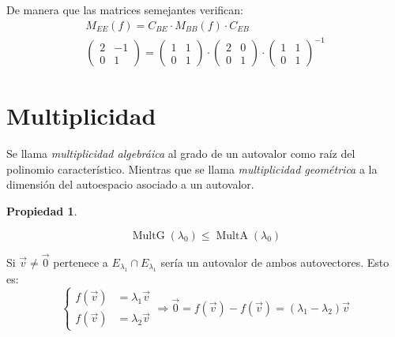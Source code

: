\documentclass[a5paper,12pt,twoside]{book}
\newtheorem{prop}{{Propiedad}}[chapter]
\begin{document}
\begin{mdframed}[style=MyFrame2]
    De manera que las matrices semejantes verifican:
    \begin{gather*}
        M_{EE}(f) = C_{BE} \cdot M_{BB}(f) \cdot C_{EB}
        \\
        \begin{pmatrix}
            2 & -1
            \\
            0 & 1
        \end{pmatrix}
        =
        \begin{pmatrix}
            1 & 1
            \\
            0 & 1
        \end{pmatrix}
        \cdot
        \begin{pmatrix}
            2 & 0
            \\
            0 & 1
        \end{pmatrix}
        \cdot
        \begin{pmatrix}
            1 & 1
            \\
            0 & 1
        \end{pmatrix}^{-1}
    \end{gather*}
\end{mdframed}


\section{Multiplicidad}

Se llama \emph{multiplicidad algebráica} al grado de un autovalor como raíz del polinomio característico. Mientras que se llama \emph{multiplicidad geométrica} a la dimensión del autoespacio asociado a un autovalor.

\begin{mdframed}[style=MyFrame1]
    \begin{prop}
    \end{prop}
    \begin{equation*}
        \operatorname{MultG} (\lambda_0) \leq \operatorname{MultA} (\lambda_0)
    \end{equation*}
\end{mdframed}

Si $\Vec{v} \neq \Vec{0}$ pertenece a $E_{\lambda_1} \cap E_{\lambda_1}$ sería un autovalor de ambos autovectores. Esto es:
\begin{equation*}
    \left\{
    \begin{aligned}
        f(\Vec{v}) &= \lambda_1 \Vec{v}
        \\
        f(\Vec{v}) &= \lambda_2 \Vec{v}
    \end{aligned}
    \right.
    \Rightarrow \Vec{0} = f(\Vec{v}) - f(\Vec{v}) = \left( \lambda_1-\lambda_2 \right) \Vec{v}
\end{equation*}
\end{document}
